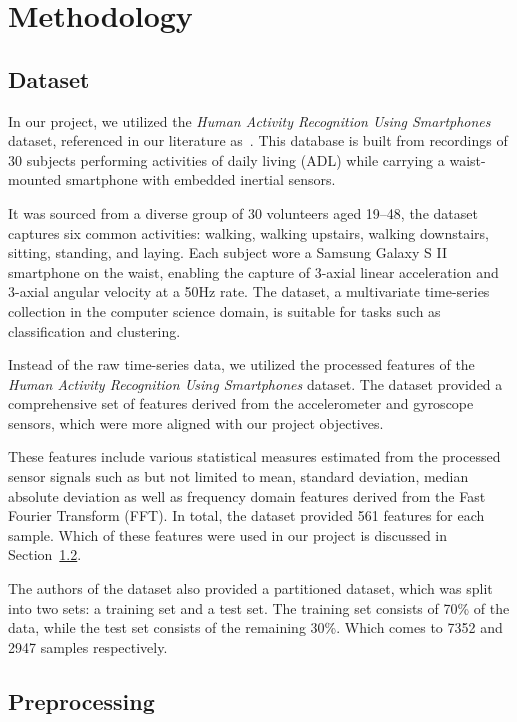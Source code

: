 \section{Methodology}\label{sec:methology}

\subsection{Dataset}\label{subsec:dataset}

In our project, we utilized the \emph{Human Activity Recognition Using Smartphones} dataset, referenced in our literature as~\cite{misc_human_activity_recognition_using_smartphones_240}.
This database is built from recordings of 30 subjects performing activities of daily living (ADL) while carrying a waist-mounted smartphone with embedded inertial sensors.

It was sourced from a diverse group of 30 volunteers aged 19--48, the dataset captures six common activities: walking, walking upstairs, walking downstairs, sitting, standing, and laying.
Each subject wore a Samsung Galaxy S II smartphone on the waist, enabling the capture of 3-axial linear acceleration and 3-axial angular velocity at a 50Hz rate.
The dataset, a multivariate time-series collection in the computer science domain, is suitable for tasks such as classification and clustering.

Instead of the raw time-series data, we utilized the processed features of the \emph{Human Activity Recognition Using Smartphones} dataset.
The dataset provided a comprehensive set of features derived from the accelerometer and gyroscope sensors, which were more aligned with our project objectives.

These features include various statistical measures estimated from the processed sensor signals such as but not limited to mean, standard deviation, median absolute deviation as well as frequency domain features derived from the Fast Fourier Transform (FFT).
In total, the dataset provided 561 features for each sample.
Which of these features were used in our project is discussed in Section~\ref{subsec:preprocessing}.

The authors of the dataset also provided a partitioned dataset, which was split into two sets: a training set and a test set.
The training set consists of 70\% of the data, while the test set consists of the remaining 30\%.
Which comes to 7352 and 2947 samples respectively.


\subsection{Preprocessing}\label{subsec:preprocessing}
